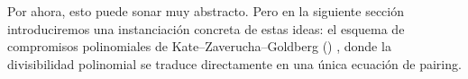 Por ahora, esto puede sonar muy abstracto. Pero en la siguiente sección introduciremos una instanciación concreta de estas ideas: el esquema de compromisos polinomiales de Kate–Zaverucha–Goldberg (\KZG) \cite{Kate2010}, donde la divisibilidad polinomial se traduce directamente en una única ecuación de pairing.
